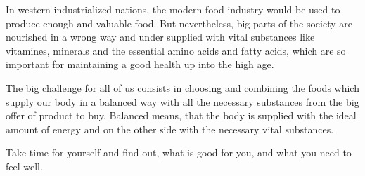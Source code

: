 \documentclass[../main.tex]{subfiles}
\begin{document}
In western industrialized nations, the modern food industry would be used to produce enough and valuable food.
But nevertheless, big parts of the society are nourished in a wrong way and under supplied with vital substances
like vitamines, minerals and the essential amino acids and fatty acids, which are so important for maintaining a good health up into the high age.

The big challenge for all of us consists in choosing and combining the foods which supply our body in a balanced way with all the necessary substances
from the big offer of product to buy.
Balanced means, that the body is supplied with the ideal amount of energy and on the other side with the necessary vital substances.

\begin{center}
\begin{fminipage}{4cm}
  Take time for yourself and find out, what is good for you, and what you need to feel well.
\end{fminipage}
\end{center}
\end{document}
